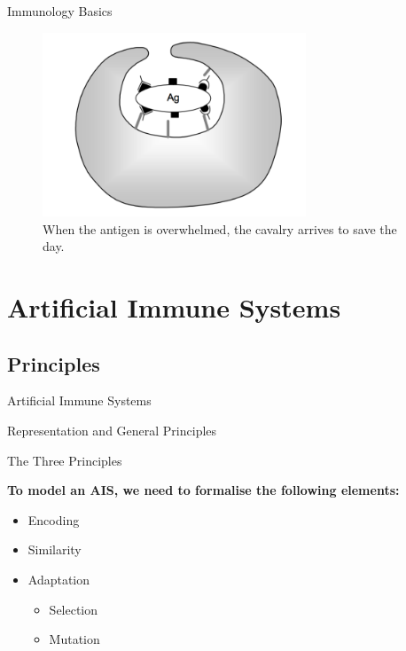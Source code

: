 \documentclass[xcolor=svgnames]{beamer}
\newcommand{\introframe}[2]{
    \begin{frame}
	   \vfill
	   \hfill\Huge{#1}
	   
	   \vspace{1em}
	   
	   \hfill\Large{#2}
	   \vfill
    \end{frame}
}
\begin{document}
        \begin{frame}{Immunology Basics}
            \begin{figure}
                \centering
                \includegraphics[width=0.7\textwidth]{fig/phagocytosis}
                \caption{When the antigen is overwhelmed, the cavalry arrives to save the day.}
            \end{figure}
        \end{frame}
        
        \section{Artificial Immune Systems}
    
    \subsection{Principles}
    
    \introframe{Artificial Immune Systems}{Representation and General Principles}
    
        \begin{frame}{The Three Principles}

            \textbf{To model an AIS, we need to formalise the following elements:}

            \begin{itemize}
                \item Encoding
                \item Similarity
                \item Adaptation
                \begin{itemize}
                    \item Selection
                    \item Mutation
                \end{itemize}
            \end{itemize}
        \end{frame}
\end{document}
